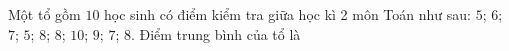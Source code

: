 \begin{ex}
Một tổ gồm $10$ học sinh có điểm kiểm tra giữa học kì 2 môn Toán như sau: $5$; $6$; $7$; $5$; $8$; $8$; $10$; $9$; $7$; $8$. Điểm trung bình của tổ là
\end{ex}
